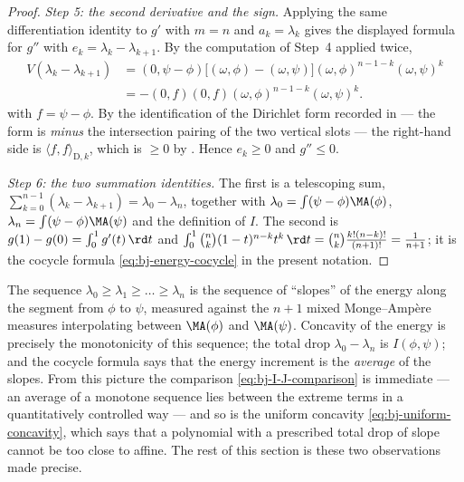 \begin{proof}
\emph{Step 5: the second derivative and the sign.}  Applying the same
differentiation identity to $g'$ with $m=n$ and $a_k=\lambda_k$ gives
the displayed formula for $g''$ with $e_k=\lambda_k-\lambda_{k+1}$.
By the computation of Step~4 applied twice,
\[
 \begin{aligned}
 V(\lambda_k-\lambda_{k+1})
 &=(0,\psi-\phi)\bigl[(\omega,\phi)-(\omega,\psi)\bigr]
    (\omega,\phi)^{n-1-k}(\omega,\psi)^k\\
 &=-(0,f)(0,f)(\omega,\phi)^{n-1-k}(\omega,\psi)^k.
 \end{aligned}
\]
with $f=\psi-\phi$.  By the identification of the Dirichlet form recorded
in  --- the form is \emph{minus} the
intersection pairing of the two vertical slots --- the right-hand side is
$\langle f,f\rangle_{\mathrm D,k}$, which is $\ge0$ by
.  Hence $e_k\ge0$ and $g''\le0$.

\emph{Step 6: the two summation identities.}  The first is a telescoping
sum, $\sum_{k=0}^{n-1}(\lambda_k-\lambda_{k+1})=\lambda_0-\lambda_n$,
together with $\lambda_0=\int(\psi-\phi)\MA(\phi)$,
$\lambda_n=\int(\psi-\phi)\MA(\psi)$ and the definition of $I$.  The
second is
$g(1)-g(0)=\int_0^1g'(t)\,\rd t$ and
$\int_0^1\binom nk(1-t)^{n-k}t^k\,\rd t=\binom nk\frac{k!(n-k)!}{(n+1)!}
=\frac1{n+1}$; it is the cocycle formula
\eqref{eq:bj-energy-cocycle} in the present notation.
\end{proof}

\begin{remark}
\label{rem:ch47-expansion-meaning}
The sequence $\lambda_0\ge\lambda_1\ge\dots\ge\lambda_n$ is the sequence
of ``slopes'' of the energy along the segment from $\phi$ to $\psi$,
measured against the $n+1$ mixed Monge--Amp\`ere measures interpolating
between $\MA(\phi)$ and $\MA(\psi)$.  Concavity of the energy is
precisely the monotonicity of this sequence; the total drop
$\lambda_0-\lambda_n$ is $I(\phi,\psi)$; and the cocycle formula says
that the energy increment is the \emph{average} of the slopes.  From this
picture the comparison \eqref{eq:bj-I-J-comparison} is immediate --- an
average of a monotone sequence lies between the extreme terms in a
quantitatively controlled way --- and so is the uniform concavity
\eqref{eq:bj-uniform-concavity}, which says that a polynomial with a
prescribed total drop of slope cannot be too close to affine.  The rest of
this section is these two observations made precise.
\end{remark}

